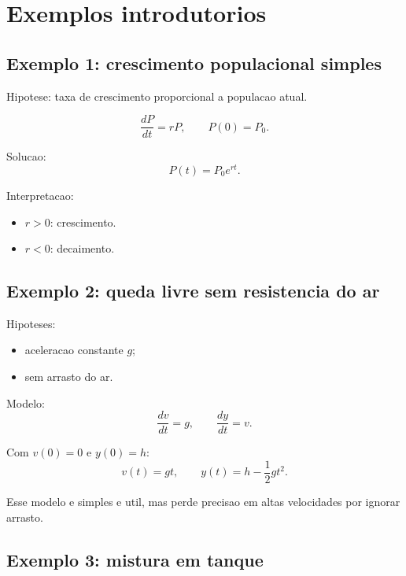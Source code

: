 \documentclass[12pt,a4paper,oneside]{book}
\theoremstyle{definition}
\begin{document}
\section{Exemplos introdutorios}

\subsection{Exemplo 1: crescimento populacional simples}

Hipotese: taxa de crescimento proporcional a populacao atual.

\begin{equation}
\frac{dP}{dt}=rP, \qquad P(0)=P_0.
\end{equation}

Solucao:
\begin{equation}
P(t)=P_0e^{rt}.
\end{equation}

Interpretacao:
\begin{itemize}
    \item $r>0$: crescimento.
    \item $r<0$: decaimento.
\end{itemize}

\subsection{Exemplo 2: queda livre sem resistencia do ar}

Hipoteses:
\begin{itemize}
    \item aceleracao constante $g$;
    \item sem arrasto do ar.
\end{itemize}

Modelo:
\begin{equation}
\frac{dv}{dt}=g, \qquad \frac{dy}{dt}=v.
\end{equation}

Com $v(0)=0$ e $y(0)=h$:
\begin{equation}
v(t)=gt, \qquad y(t)=h-\frac{1}{2}gt^2.
\end{equation}

Esse modelo e simples e util, mas perde precisao em altas velocidades por ignorar arrasto.

\subsection{Exemplo 3: mistura em tanque}
\end{document}
